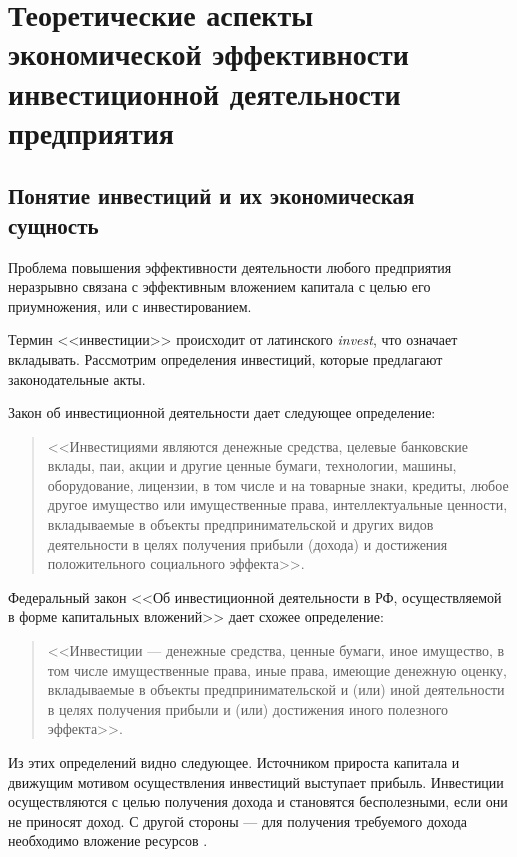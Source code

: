 \section{Теоретические аспекты экономической эффективности инвестиционной деятельности предприятия}
\subsection{Понятие инвестиций и их экономическая сущность}
Проблема повышения эффективности деятельности любого предприятия неразрывно связана с эффективным вложением капитала с целью его приумножения, или с инвестированием.

Термин <<инвестиции>> происходит от латинского \textit{invest}, что означает вкладывать. Рассмотрим определения инвестиций, которые предлагают законодательные акты.

Закон об инвестиционной деятельности \cite{1488} дает следующее определение:
\begin{quote}
	<<Инвестициями являются денежные средства, целевые банковские вклады, паи, акции и другие ценные бумаги, технологии, машины, оборудование, лицензии, в том числе и на товарные знаки, кредиты, любое другое имущество или имущественные права, интеллектуальные ценности, вкладываемые в объекты предпринимательской и других видов деятельности в целях получения прибыли (дохода) и достижения положительного социального эффекта>>.
\end{quote}

Федеральный закон <<Об инвестиционной деятельности в РФ, осуществляемой в форме капитальных вложений>> \cite{39-fz} дает схожее определение:
\begin{quote}
	<<Инвестиции --- денежные средства, ценные бумаги, иное имущество, в том числе имущественные права, иные права, имеющие денежную оценку, вкладываемые в объекты предпринимательской и (или) иной деятельности в целях получения прибыли и (или) достижения иного полезного эффекта>>.
\end{quote}

Из этих определений видно следующее. Источником прироста капитала и движущим мотивом осуществления инвестиций выступает прибыль. Инвестиции осуществляются с целью получения дохода и становятся бесполезными, если они не приносят доход. С другой стороны --- для получения требуемого дохода необходимо вложение ресурсов \cite[с. 13]{kasyanenko}.

